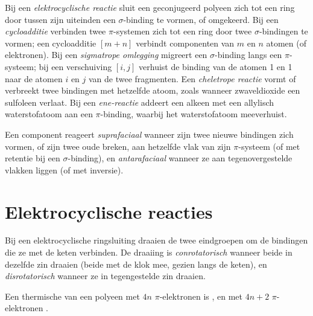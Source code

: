 \begin{definition}\label{def:b3:pericyclic:families}
Bij een \emph{elektrocyclische reactie}
sluit een geconjugeerd polyeen zich tot een ring door tussen zijn
uiteinden een $\sigma$-binding te vormen, of omgekeerd. Bij een
\emph{cycloadditie} verbinden twee $\pi$-systemen zich tot een ring door twee $\sigma$-bindingen te
vormen; een cycloadditie $[m + n]$ verbindt componenten
van $m$ en $n$ atomen (of elektronen). Bij een
\emph{sigmatrope omlegging} migreert een $\sigma$-binding langs een $\pi$-systeem; bij een verschuiving $[i, j]$ verhuist de binding van de atomen 1 en 1 naar de atomen $i$ en $j$
van de twee fragmenten. Een
\emph{cheletrope reactie} vormt of verbreekt
twee bindingen met hetzelfde atoom, zoals wanneer zwaveldioxide een
sulfoleen verlaat. Bij een \emph{ene-reactie} addeert
een alkeen met een allylisch waterstofatoom aan een $\pi$-binding, waarbij het waterstofatoom meeverhuist.
\end{definition}

\begin{definition}\label{def:b3:pericyclic:faciality}
Een component reageert \emph{suprafaciaal} wanneer zijn
twee nieuwe bindingen zich vormen, of zijn twee oude breken, aan
hetzelfde vlak van zijn $\pi$-systeem (of met
retentie bij een $\sigma$-binding), en \emph{antarafaciaal} wanneer
ze aan tegenovergestelde vlakken liggen (of met inversie).
\end{definition}

\section{Elektrocyclische reacties}

\begin{definition}\label{def:b3:pericyclic:rotation-modes}
Bij een elektrocyclische ringsluiting draaien de twee eindgroepen om de
bindingen die ze met de keten verbinden. De draaiing is
\emph{conrotatorisch} wanneer beide in dezelfde zin
draaien (beide met de klok mee, gezien langs de keten), en
\emph{disrotatorisch} wanneer ze in tegengestelde
zin draaien.
\end{definition}

\begin{theorem}\label{thm:b3:pericyclic:electrocyclic}
Een thermische  van een polyeen met $4n$ $\pi$-elektronen is
, en met $4n + 2$ $\pi$-elektronen .
\end{theorem}

